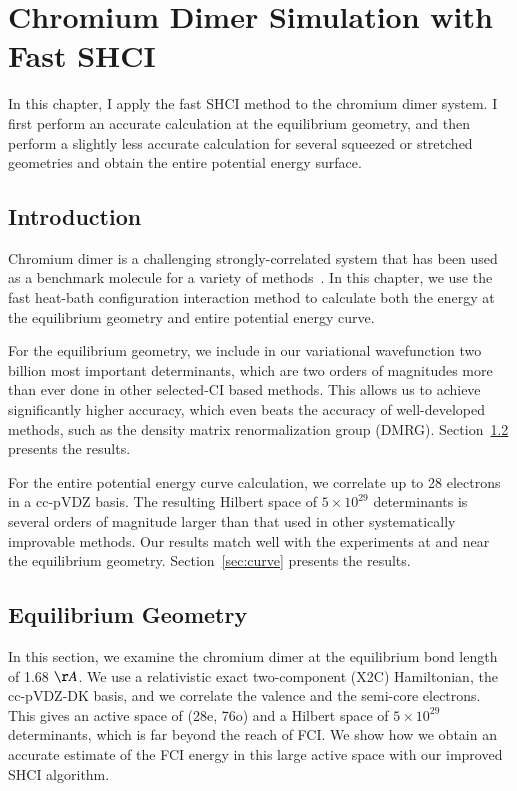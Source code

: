 \chapter{Chromium Dimer Simulation with Fast SHCI}
In this chapter, I apply the fast SHCI method to the chromium dimer system.
I first perform an accurate calculation at the equilibrium geometry, and then perform a slightly less accurate calculation for several squeezed or stretched geometries and obtain the entire potential energy surface.

\section{Introduction}

Chromium dimer is a challenging strongly-correlated system
that has been used as a benchmark molecule for a variety of methods~\cite{Scu-JCP-91,KurYan-JCP-11,PurZhaKra-JCP-15,MaManOlsGag-JCTC-16,VanMalVer-JCTC-16,GuoWatHuSunCha-JCTC-16}.
In this chapter, we use the fast heat-bath configuration interaction method to calculate both the energy at the equilibrium geometry and entire potential energy curve.

For the equilibrium geometry, we include in our variational wavefunction two billion most important determinants, which are two orders of magnitudes more than ever done in other selected-CI based methods.
This allows us to achieve significantly higher accuracy, which even beats the accuracy of well-developed methods, such as the density matrix renormalization group (DMRG).
Section~\ref{sec:eq} presents the results.

For the entire potential energy curve calculation, we correlate up to 28 electrons in a cc-pVDZ basis.
The resulting Hilbert space of $5 \times 10^{29}$ determinants is several orders of magnitude larger than that used in other
systematically improvable methods.
Our results match well with the experiments at and near the equilibrium geometry.
Section~\ref{sec:curve} presents the results.

\section{Equilibrium Geometry}
\label{sec:eq}
In this section, we examine the chromium dimer at the equilibrium bond length of 1.68 $\AA$. %
We use a relativistic exact two-component (X2C) Hamiltonian, the cc-pVDZ-DK basis, and we correlate the valence and the semi-core electrons.
This gives an active space of (28e, 76o) and a Hilbert space of $5\times10^{29}$ determinants, which is far beyond the reach of FCI.
We show how we obtain an accurate estimate of the FCI energy in this large active space with our improved SHCI algorithm.

